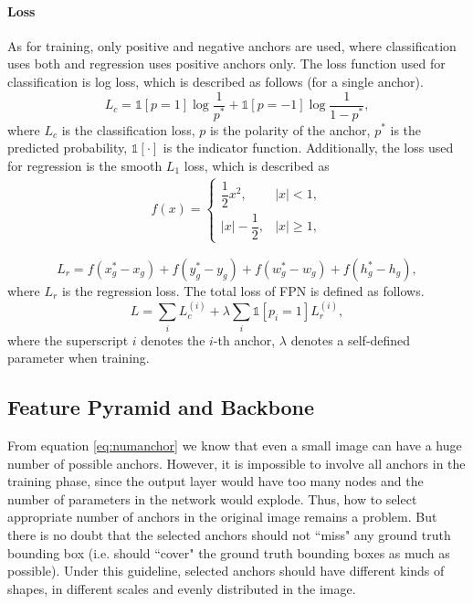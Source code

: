 

\paragraph{Loss}
As for training, only positive and negative anchors are used, where classification uses both and regression uses positive anchors only. The loss function used for classification is log loss, which is described as follows (for a single anchor).
\begin{equation}
	L_c = \mathbb{1}[p = 1]\log{\frac{1}{p^*}} + \mathbb{1}[p = -1]\log{\frac{1}{1-p^*}},
\end{equation}
where $L_c$ is the classification loss, $p$ is the polarity of the anchor, $p^*$ is the predicted probability, $\mathbb{1}[\cdot]$ is the indicator function. Additionally, the loss used for regression is the smooth $L_1$ loss, which is described as
\begin{equation}
\begin{aligned}
	f(x) = \begin{cases}
		\dfrac{1}{2}x^2, & \lvert x \rvert < 1, \\
		\lvert x \rvert - \dfrac{1}{2}, & \lvert x \rvert \geqslant 1,
	\end{cases}
\end{aligned}
\end{equation}

\begin{equation}
	L_r = f(x_g^* - x_g) + f(y_g^* - y_g) + f(w_g^* - w_g) + f(h_g^* - h_g),
\end{equation}
where $L_r$ is the regression loss. The total loss of FPN is defined as follows.
\begin{equation}
	L = \sum_{i}^{} L_c^{(i)} + \lambda\sum_{i}^{}\mathbb{1}[p_i = 1]L_r^{(i)},
\end{equation}
where the superscript $i$ denotes the $i$-th anchor, $\lambda$ denotes a self-defined parameter when training.

\subsection{Feature Pyramid and Backbone}\label{fpnbone}

From equation \ref{eq:numanchor} we know that even a small image can have a huge number of possible anchors. However, it is impossible to involve all anchors in the training phase, since the output layer would have too many nodes and the number of parameters in the network would explode. Thus, how to select appropriate number of anchors in the original image remains a problem. But there is no doubt that the selected anchors should not ``miss" any ground truth bounding box (i.e. should ``cover" the ground truth bounding boxes as much as possible). Under this guideline, selected anchors should have different kinds of shapes, in different scales and evenly distributed in the image.

